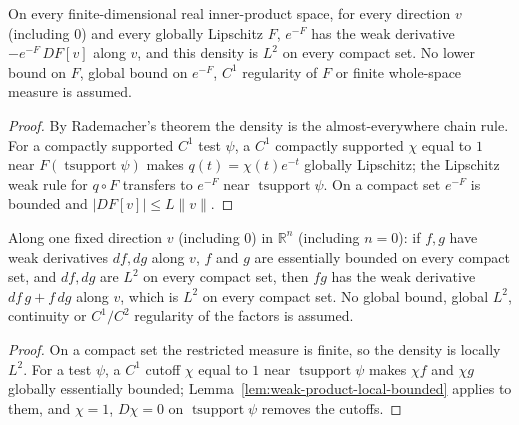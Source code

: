 \begin{lemma}
  \label{lem:weak-exp-neg-lipschitz}
  \leanok
  On every finite-dimensional real inner-product space, for every direction $v$ (including $0$) and every globally Lipschitz $F$,
  $e^{-F}$ has the weak derivative $-e^{-F}\,DF[v]$ along $v$, and this density is $L^2$ on every compact set. No lower bound on $F$,
  global bound on $e^{-F}$, $C^1$ regularity of $F$ or finite whole-space measure is assumed.
\end{lemma}
\begin{proof}
  \leanok
  By Rademacher's theorem the density is the almost-everywhere chain rule. For a compactly supported $C^1$ test $\psi$, a $C^1$
  compactly supported $\chi$ equal to $1$ near $F(\operatorname{tsupport}\psi)$ makes $q(t)=\chi(t)e^{-t}$ globally Lipschitz; the
  Lipschitz weak rule for $q\circ F$ transfers to $e^{-F}$ near $\operatorname{tsupport}\psi$. On a compact set $e^{-F}$ is bounded
  and $|DF[v]|\le L\|v\|$.
\end{proof}

\begin{lemma}
  \label{lem:weak-product-locally-bounded}
  \leanok
  Along one fixed direction $v$ (including $0$) in $\mathbb R^n$ (including $n=0$): if $f,g$ have weak derivatives $df,dg$ along $v$,
  $f$ and $g$ are essentially bounded on every compact set, and $df,dg$ are $L^2$ on every compact set, then $fg$ has the weak
  derivative $df\,g+f\,dg$ along $v$, which is $L^2$ on every compact set. No global bound, global $L^2$, continuity or $C^1/C^2$
  regularity of the factors is assumed.
\end{lemma}
\begin{proof}
  \leanok
  On a compact set the restricted measure is finite, so the density is locally $L^2$. For a test $\psi$, a $C^1$ cutoff $\chi$ equal to
  $1$ near $\operatorname{tsupport}\psi$ makes $\chi f$ and $\chi g$ globally essentially bounded; Lemma~\ref{lem:weak-product-local-bounded}
  applies to them, and $\chi=1$, $D\chi=0$ on $\operatorname{tsupport}\psi$ removes the cutoffs.
\end{proof}

